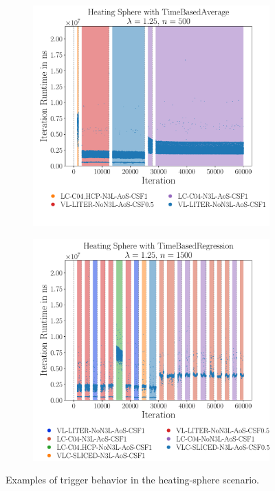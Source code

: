 \begin{figure}[htpb]
	\begin{subfigure}[c]{0.5\textwidth}
		\centering
		\includegraphics[width=\textwidth]{./Figures/plots/heating-sphere_configs_good.pdf}
	\end{subfigure}
	\begin{subfigure}[c]{0.5\textwidth}
		\centering
		\includegraphics[width=\textwidth]{./Figures/plots/heating-sphere_configs_bad.pdf}
	\end{subfigure}
	\caption{Examples of trigger behavior in the heating-sphere scenario.}
	\label{fig:hs_trigger_behavior}
\end{figure}

